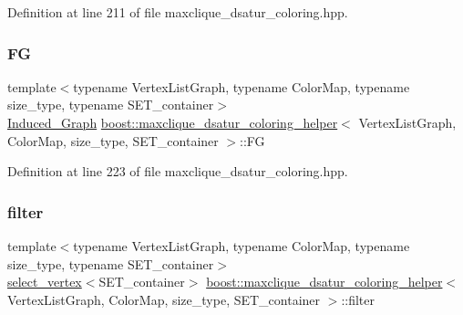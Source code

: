 Definition at line 211 of file maxclique\+\_\+dsatur\+\_\+coloring.\+hpp.

\mbox{\label{classboost_1_1maxclique__dsatur__coloring__helper_a96fe10b4473546d759458fe7f3bbd67f}} 
\subsubsection{\texorpdfstring{FG}{FG}}
{\footnotesize\ttfamily template$<$typename Vertex\+List\+Graph, typename Color\+Map, typename size\+\_\+type, typename S\+E\+T\+\_\+container$>$ \\
\hyperlink{classboost_1_1maxclique__dsatur__coloring__helper_a2928978558b9545fe58e467dd8adf0e5}{Induced\+\_\+\+Graph} \hyperlink{classboost_1_1maxclique__dsatur__coloring__helper}{boost\+::maxclique\+\_\+dsatur\+\_\+coloring\+\_\+helper}$<$ Vertex\+List\+Graph, Color\+Map, size\+\_\+type, S\+E\+T\+\_\+container $>$\+::FG\hspace{0.3cm}{\ttfamily [private]}}



Definition at line 223 of file maxclique\+\_\+dsatur\+\_\+coloring.\+hpp.

\mbox{\label{classboost_1_1maxclique__dsatur__coloring__helper_a2e3327e697fcd36678ffa1f5ab6617a1}} 
\subsubsection{\texorpdfstring{filter}{filter}}
{\footnotesize\ttfamily template$<$typename Vertex\+List\+Graph, typename Color\+Map, typename size\+\_\+type, typename S\+E\+T\+\_\+container$>$ \\
\hyperlink{structboost_1_1select__vertex}{select\+\_\+vertex}$<$S\+E\+T\+\_\+container$>$ \hyperlink{classboost_1_1maxclique__dsatur__coloring__helper}{boost\+::maxclique\+\_\+dsatur\+\_\+coloring\+\_\+helper}$<$ Vertex\+List\+Graph, Color\+Map, size\+\_\+type, S\+E\+T\+\_\+container $>$\+::filter\hspace{0.3cm}{\ttfamily [private]}}



